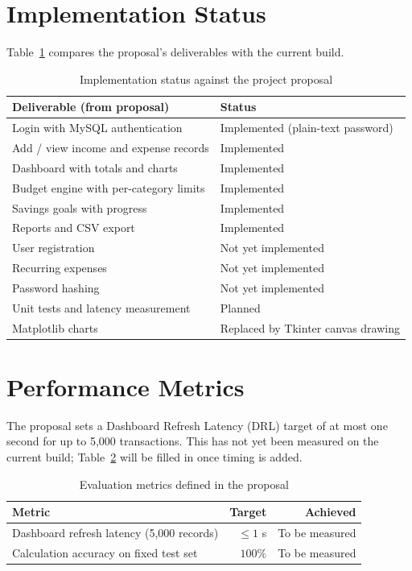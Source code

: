 \documentclass{tietreport}
\begin{document}
\section{Implementation Status}

Table~\ref{tab:status} compares the proposal's deliverables with
the current build.

\begin{table}[htbp]
\centering
\begin{tabular}{|l|l|}
  \hline
  \textbf{Deliverable (from proposal)} & \textbf{Status} \\
  \hline
  Login with MySQL authentication & Implemented (plain-text password) \\
  \hline
  Add / view income and expense records & Implemented \\
  \hline
  Dashboard with totals and charts & Implemented \\
  \hline
  Budget engine with per-category limits & Implemented \\
  \hline
  Savings goals with progress & Implemented \\
  \hline
  Reports and CSV export & Implemented \\
  \hline
  User registration & Not yet implemented \\
  \hline
  Recurring expenses & Not yet implemented \\
  \hline
  Password hashing & Not yet implemented \\
  \hline
  Unit tests and latency measurement & Planned \\
  \hline
  Matplotlib charts & Replaced by Tkinter canvas drawing \\
  \hline
\end{tabular}
\caption{Implementation status against the project proposal}
\label{tab:status}
\end{table}

\section{Performance Metrics}

The proposal sets a Dashboard Refresh Latency (DRL) target of
at most one second for up to 5,000 transactions. This has not yet
been measured on the current build; Table~\ref{tab:performance}
will be filled in once timing is added.

\begin{table}[htbp]
\centering
\begin{tabular}{|l|r|r|}
  \hline
  \textbf{Metric} & \textbf{Target} & \textbf{Achieved} \\
  \hline
  Dashboard refresh latency (5,000 records) & $\leq 1$ s & To be measured \\
  \hline
  Calculation accuracy on fixed test set & $100\%$ & To be measured \\
  \hline
\end{tabular}
\caption{Evaluation metrics defined in the proposal}
\label{tab:performance}
\end{table}
\end{document}

